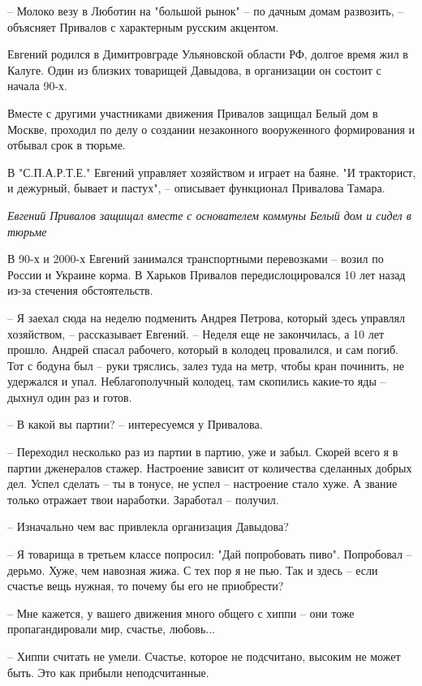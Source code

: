 – Молоко везу в Люботин на "большой рынок" – по дачным домам развозить, –
объясняет Привалов с характерным русским акцентом.

Евгений родился в Димитровграде Ульяновской области РФ, долгое время жил в
Калуге. Один из близких товарищей Давыдова, в организации он состоит с начала
90-х. 

Вместе с другими участниками движения Привалов защищал Белый дом в Москве,
проходил по делу о создании незаконного вооруженного формирования и отбывал
срок в тюрьме.

В "С.П.А.Р.Т.Е." Евгений управляет хозяйством и играет на баяне. "И тракторист,
и дежурный, бывает и пастух", – описывает функционал Привалова Тамара.

\emph{Евгений Привалов защищал вместе с основателем коммуны Белый дом и сидел в
тюрьме}

В 90-х и 2000-х Евгений занимался транспортными перевозками – возил по России и
Украине корма. В Харьков Привалов передислоцировался 10 лет назад из-за
стечения обстоятельств.

– Я заехал сюда на неделю подменить Андрея Петрова, который здесь управлял
хозяйством, – рассказывает Евгений. – Неделя еще не закончилась, а 10 лет
прошло. Андрей спасал рабочего, который в колодец провалился, и сам погиб. Тот
с бодуна был – руки тряслись, залез туда на метр, чтобы кран починить, не
удержался и упал. Неблагополучный колодец, там скопились какие-то яды – дыхнул
один раз и готов.

– В какой вы партии? – интересуемся у Привалова.

– Переходил несколько раз из партии в партию, уже и забыл. Скорей всего я в
партии дженералов стажер. Настроение зависит от количества сделанных добрых
дел. Успел сделать – ты в тонусе, не успел – настроение стало хуже. А звание
только отражает твои наработки. Заработал – получил.

– Изначально чем вас привлекла организация Давыдова?

– Я товарища в третьем классе попросил: "Дай попробовать пиво". Попробовал –
дерьмо. Хуже, чем навозная жижа. С тех пор я не пью. Так и здесь – если счастье
вещь нужная, то почему бы его не приобрести? 

– Мне кажется, у вашего движения много общего с хиппи – они тоже
пропагандировали мир, счастье, любовь...

– Хиппи считать не умели. Счастье, которое не подсчитано, высоким не может
быть. Это как прибыли неподсчитанные. 

